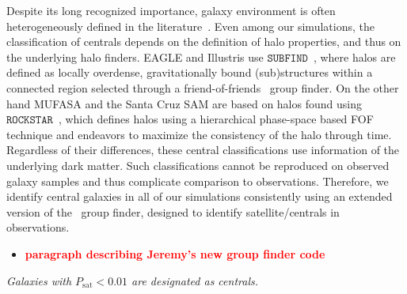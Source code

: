 \documentclass[preprint2,tighten]{aastex62}
\newcommand{\todo}[1]{{\bf \textcolor{red}{ #1}}}
\begin{document}
Despite its long recognized importance, galaxy environment is often 
heterogeneously defined in the literature~\cite{muldrew2012}. Even among our 
simulations, the classification of centrals depends on 
the definition of halo properties, and thus on the underlying halo 
finders. EAGLE and Illustris use $\mathtt{SUBFIND}$~\citep{springel2001},
where halos are defined as locally overdense, gravitationally bound
(sub)structures within a connected region selected through a 
friend-of-friends~\citep[FOF;][]{davis1985} group finder. On the other hand 
MUFASA and the Santa Cruz SAM are based on halos found using 
$\mathtt{ROCKSTAR}$~\citep{behroozi2013}, which defines halos using a
hierarchical phase-space based FOF technique and endeavors to maximize 
the consistency of the halo through time.  
Regardless of their differences, these central classifications use 
information of the underlying dark matter. Such classifications 
cannot be reproduced on observed galaxy samples and thus complicate 
comparison to observations. Therefore, we identify central galaxies in 
all of our simulations 
consistently using an extended version of the~\cite{tinker2011} group 
finder, designed to identify satellite/centrals in observations. 



\begin{itemize}
    \item \todo{paragraph describing Jeremy's new group finder code} 
\end{itemize}
\emph{Galaxies with $P_\mathrm{sat} < 0.01$ are designated as centrals.} 
\end{document}
